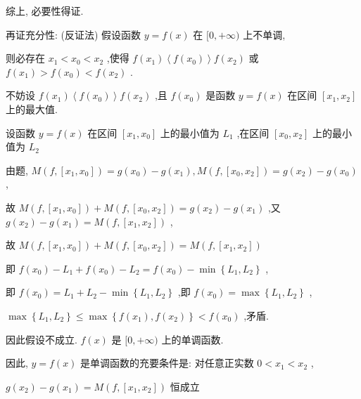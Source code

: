 \documentclass[10pt]{article}
\begin{document}
综上, 必要性得证.

再证充分性: (反证法) 假设函数 \(y = f\left( x\right)\) 在 \(\lbrack 0, + \infty )\) 上不单调,

则必存在 \({x}_{1} < {x}_{0} < {x}_{2}\) ,使得 \(f\left( {x}_{1}\right) \left\langle  {f\left( {x}_{0}\right) }\right\rangle  f\left( {x}_{2}\right)\) 或 \(f\left( {x}_{1}\right)  > f\left( {x}_{0}\right)  < f\left( {x}_{2}\right)\) .

不妨设 \(f\left( {x}_{1}\right) \left\langle  {f\left( {x}_{0}\right) }\right\rangle  f\left( {x}_{2}\right)\) ,且 \(f\left( {x}_{0}\right)\) 是函数 \(y = f\left( x\right)\) 在区间 \(\left\lbrack  {{x}_{1},{x}_{2}}\right\rbrack\) 上的最大值.

设函数 \(y = f\left( x\right)\) 在区间 \(\left\lbrack  {{x}_{1},{x}_{0}}\right\rbrack\) 上的最小值为 \({L}_{1}\) ,在区间 \(\left\lbrack  {{x}_{0},{x}_{2}}\right\rbrack\) 上的最小值为 \({L}_{2}\)

由题, \(M\left( {f,\left\lbrack  {{x}_{1},{x}_{0}}\right\rbrack  }\right)  = g\left( {x}_{0}\right)  - g\left( {x}_{1}\right) ,M\left( {f,\left\lbrack  {{x}_{0},{x}_{2}}\right\rbrack  }\right)  = g\left( {x}_{2}\right)  - g\left( {x}_{0}\right)\) ,

故 \(M\left( {f,\left\lbrack  {{x}_{1},{x}_{0}}\right\rbrack  }\right)  + M\left( {f,\left\lbrack  {{x}_{0},{x}_{2}}\right\rbrack  }\right)  = g\left( {x}_{2}\right)  - g\left( {x}_{1}\right)\) ,又 \(g\left( {x}_{2}\right)  - g\left( {x}_{1}\right)  = M\left( {f,\left\lbrack  {{x}_{1},{x}_{2}}\right\rbrack  }\right)\) ,

故 \(M\left( {f,\left\lbrack  {{x}_{1},{x}_{0}}\right\rbrack  }\right)  + M\left( {f,\left\lbrack  {{x}_{0},{x}_{2}}\right\rbrack  }\right)  = M\left( {f,\left\lbrack  {{x}_{1},{x}_{2}}\right\rbrack  }\right)\)

即 \(f\left( {x}_{0}\right)  - {L}_{1} + f\left( {x}_{0}\right)  - {L}_{2} = f\left( {x}_{0}\right)  - \min \left\{  {{L}_{1},{L}_{2}}\right\}\) ,

即 \(f\left( {x}_{0}\right)  = {L}_{1} + {L}_{2} - \min \left\{  {{L}_{1},{L}_{2}}\right\}\) ,即 \(f\left( {x}_{0}\right)  = \max \left\{  {{L}_{1},{L}_{2}}\right\}\) ,

\(\max \left\{  {{L}_{1},{L}_{2}}\right\}   \leq  \max \left\{  {f\left( {x}_{1}\right) ,f\left( {x}_{2}\right) }\right\}   < f\left( {x}_{0}\right)\) ,矛盾.

因此假设不成立. \(f\left( x\right)\) 是 \(\lbrack 0, + \infty )\) 上的单调函数.

因此, \(y = f\left( x\right)\) 是单调函数的充要条件是: 对任意正实数 \(0 < {x}_{1} < {x}_{2}\) ,

\(g\left( {x}_{2}\right)  - g\left( {x}_{1}\right)  = M\left( {f,\left\lbrack  {{x}_{1},{x}_{2}}\right\rbrack  }\right)\) 恒成立
\end{document}

